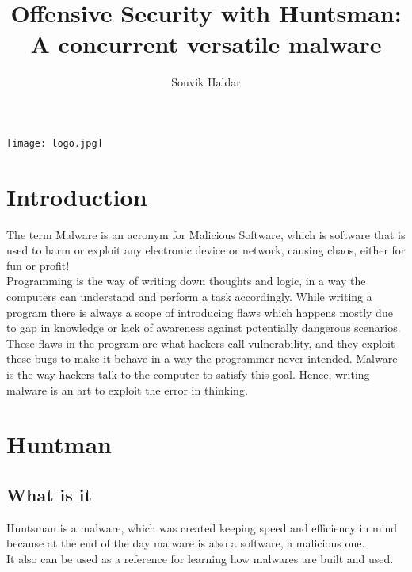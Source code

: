 \documentclass[12pt]{article}
\title{Offensive Security with Huntsman: A concurrent versatile malware}
\author{Souvik Haldar}
\begin{document}
\maketitle
\texttt{[image: logo.jpg]}

\section{Introduction}
The term Malware is an acronym for Malicious Software, which is software that is used to harm or exploit any electronic device or network, causing chaos, either for fun or profit!\\
Programming is the way of writing down thoughts and logic, in a way the computers can understand and perform a task accordingly. While writing a program there is always a scope of introducing flaws which happens mostly due to gap in knowledge or lack of awareness against potentially dangerous scenarios. These flaws in the program are what hackers call vulnerability, and they exploit these bugs to make it behave in a way the programmer never intended. Malware is the way hackers talk to the computer to satisfy this goal. Hence, writing malware is an art to exploit the error in thinking. 

\section{Huntman}
\subsection{What is it} 
Huntsman is a malware, which was created keeping speed and efficiency in mind because at the end of the day malware is also a software, a malicious one.\\ 
It also can be used as a reference for learning how malwares are built and used. 
\end{document}
